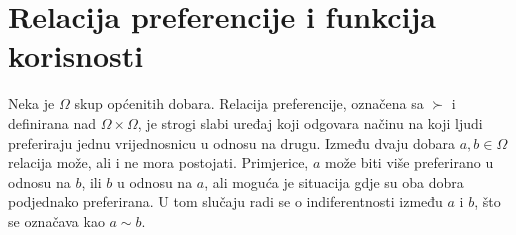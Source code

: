 \documentclass[lmodern, utf8, diplomski, numeric]{fer}
\begin{document}

  \section{Relacija preferencije i funkcija korisnosti}
  Neka je $\Omega$ skup općenitih dobara.
  Relacija preferencije, označena sa $\succ$ i definirana nad $\Omega \times \Omega$, je strogi slabi uređaj koji odgovara načinu na koji ljudi preferiraju jednu vrijednosnicu u odnosu na drugu.
  Između dvaju dobara $a, b \in \Omega$ relacija može, ali i ne mora postojati.
  Primjerice, $a$ može biti više preferirano u odnosu na $b$, ili $b$ u odnosu na $a$, ali moguća je situacija gdje su oba dobra podjednako preferirana.
  U tom slučaju radi se o indiferentnosti između $a$ i $b$, što se označava kao $a \sim b$.
\end{document}
